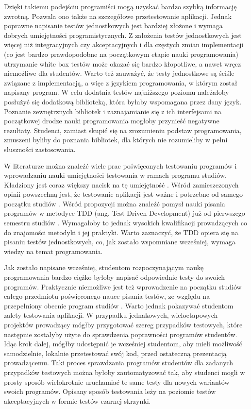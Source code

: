 Dzięki takiemu podejściu programiści mogą uzyskać bardzo szybką informację zwrotną.
Pozwala ono także na szczegółowe przetestowanie aplikacji.
Jednak poprawne napisanie testów jednostkowych jest bardziej złożone i wymaga dobrych umiejętności programistycznych.
Z założenia testów jednostkowych jest więcej niż integracyjnych czy akceptacyjnych i dla częstych zmian implementacji (co jest bardzo prawdopodobne na początkowym etapie nauki programowania) utrzymanie white box testów może okazać się bardzo kłopotliwe, a nawet wręcz niemożliwe dla studentów.
Warto też zauważyć, że testy jednostkowe są ściśle związane z implementacją, a więc z językiem programowania, w którym został napisany program.
W celu dodatnia testów najniższego poziomu należałoby posłużyć się dodatkową biblioteką, która byłaby wspomagana przez dany język.
Poznanie zewnętrznych bibliotek i zaznajamianie się z ich interfejsami na początkowej drodze nauki programowania mogłoby przynieść negatywne rezultaty.
Studenci, zamiast skupić się na zrozumieniu podstaw programowania, zmuszeni byliby do poznania bibliotek, dla których nie rozumieliby w pełni słuszności zastosowania.

W literaturze można znaleźć wiele prac poświęconych testowaniu programów i wprowadzaniu nauki umiejętności testowania w ramach programu studiów.
Kładziony jest coraz większy nacisk na tę umiejętność \cite{tests-important}.
Wśród zamieszczonych opinii powszechną jest, że testowanie aplikacji jest ważne i potrzebne od samego początku studiów \cite{test-from-scratch}.
Wśród propozycji można znaleźć pomysł nauki pisania programów w metodyce TDD (ang. Test Driven Development) już od pierwszego semestru studiów \cite{tdd-on-start}.
Wymagałoby to jednak wysokich kwalifikacji prowadzących co do znajomości metodyki i jej praktyki.
Warto zaznaczyć, że TDD opiera się na pisaniu testów jednostkowych, co, jak zostało wspomniane wcześniej, wymaga wiedzy na temat programowania.

Jak zostało napisane wcześniej, studentom rozpoczynającym naukę programowania bardzo ciężko byłoby napisać odpowiednie testy do swoich programów.
Praktycznie niemożliwe jest też wprowadzenie na początku studiów całego przedmiotu poświęconego nauce pisania testów, ze względu na przepełniony obecnie program studiów \cite{overflow-studies-program}.
Warto jednak pokazywać studentom zalety testowania aplikacji.
W przypadku jednakowych, wieloetapowych projektów prowadzący mógłby przygotować szereg przypadków testowych, które następnie zostałyby użyte do sprawdzenia poprawności programów studentów.
Idąc krok dalej, mógłby udostępnić je wcześniej studentom, aby mieli możliwość samodzielnie, lokalnie przetestować swój kod, przed ostateczną prezentacją prowadzącemu.
Taki proces sprawdzania programów studentów dla zadanych przypadków testowych można byłoby zautomatyzować tak, aby studenci mogli w prosty sposób wielokrotnie uruchamiać te same testy dla nowych wariantów swoich programów.
Opisany sposób testowania leży na poziomie testów akceptacyjnych w formie testów czarnej skrzynki.

